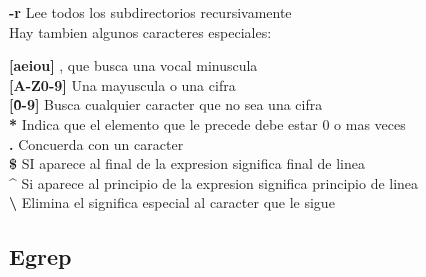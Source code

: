 \documentclass[11pt]{article}
\begin{document}
\hspace{2cm} \textbf{-r}\hspace{2cm} Lee todos los subdirectorios recursivamente\\


Hay tambien algunos caracteres especiales:\\

\vspace{2mm}

\hspace{2cm} \textbf{[aeiou]}\hspace{2cm} , que busca una vocal minuscula\\

\hspace{2cm} \textbf{[A-Z0-9]}\hspace{2cm} Una mayuscula o una cifra\\

\hspace{2cm} \textbf{[\^0-9]}\hspace{2cm} Busca cualquier caracter que no sea una cifra\\

\hspace{2cm} \textbf{*}\hspace{2cm} Indica que el elemento que le precede debe estar 0 o mas veces \\

\hspace{2cm} \textbf{.}\hspace{2cm} Concuerda con un caracter\\

\hspace{2cm} \textbf{\$}\hspace{2cm} SI aparece al final de la expresion significa final de linea\\

\hspace{2cm} \textbf{\^}\hspace{2cm} Si aparece al principio de la expresion significa principio de linea\\

\hspace{2cm} \textbf{\textbackslash}\hspace{2cm} Elimina el significa especial al caracter que le sigue \\

\subsection {Egrep}
\end{document}
